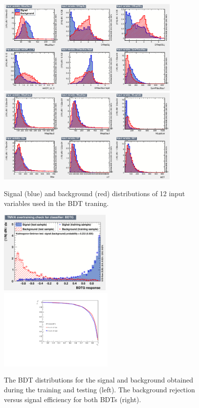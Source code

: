 \begin{figure}[htbp]
  \begin{center}
    \includegraphics[width=0.8\textwidth, keepaspectratio]{figures/TauChannels/1l2tau/BDT/variables_id_c1.pdf}
    \includegraphics[width=0.8\textwidth, keepaspectratio]{figures/TauChannels/1l2tau/BDT/variables_id_c2.pdf}
  \end{center}
  \caption{\label{fig:BDTinputs_1l2tau} Signal (blue) and background (red) distributions of 12 input variables used in the BDT traning.}
\end{figure}

\begin{figure}[htbp]
  \begin{center}
    \includegraphics[width=0.49\textwidth, keepaspectratio]{figures/TauChannels/1l2tau/BDT/overtrain_BDTG}
    \includegraphics[width=0.5\textwidth, keepaspectratio]{figures/TauChannels/1l2tau/BDT/ROC}
  \end{center}
  \caption{\label{fig:TrainBDT_1l2tau} The BDT distributions for the signal and background obtained during the training and testing (left). The background rejection versus signal efficiency for both BDTs (right).}
\end{figure}

